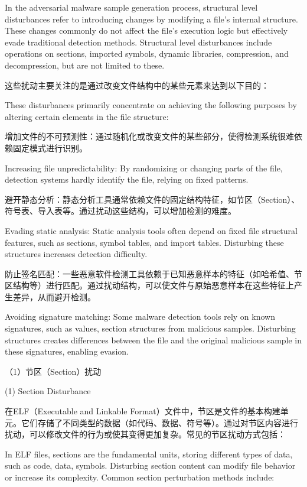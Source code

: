 In the adversarial malware sample generation process, structural level disturbances refer to introducing changes by modifying a file's internal structure. These changes commonly do not affect the file's execution logic but effectively evade traditional detection methods. Structural level disturbances include operations on sections, imported symbols, dynamic libraries, compression, and decompression, but are not limited to these.

这些扰动主要关注的是通过改变文件结构中的某些元素来达到以下目的：

These disturbances primarily concentrate on achieving the following purposes by altering certain elements in the file structure:

增加文件的不可预测性：通过随机化或改变文件的某些部分，使得检测系统很难依赖固定模式进行识别。

Increasing file unpredictability: By randomizing or changing parts of the file, detection systems hardly identify the file, relying on fixed patterns.

避开静态分析：静态分析工具通常依赖文件的固定结构特征，如节区（Section）、符号表、导入表等。通过扰动这些结构，可以增加检测的难度。

Evading static analysis: Static analysis tools often depend on fixed file structural features, such as sections, symbol tables, and import tables. Disturbing these structures increases detection difficulty.

防止签名匹配：一些恶意软件检测工具依赖于已知恶意样本的特征（如哈希值、节区结构等）进行匹配。通过扰动结构，可以使文件与原始恶意样本在这些特征上产生差异，从而避开检测。

Avoiding signature matching: Some malware detection tools rely on known signatures, such as values, section structures from malicious samples. Disturbing structures creates differences between the file and the original malicious sample in these signatures, enabling evasion.

（1）节区（Section）扰动

(1) Section Disturbance

在ELF（Executable and Linkable Format）文件中，节区是文件的基本构建单元。它们存储了不同类型的数据（如代码、数据、符号等）。通过对节区内容进行扰动，可以修改文件的行为或使其变得更加复杂。常见的节区扰动方式包括：

In ELF files, sections are the fundamental units, storing different types of data, such as code, data, symbols. Disturbing section content can modify file behavior or increase its complexity. Common section perturbation methods include:


